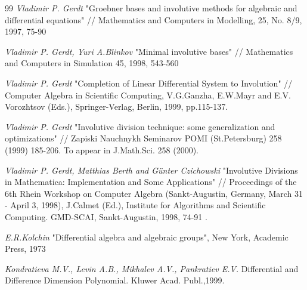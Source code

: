 \documentclass[11pt, draft]{article}
\begin{document}
\begin{thebibliography}{99}
\emph{Vladimir P. Gerdt} "Groebner bases and involutive methods
for algebraic and differential equations" // Mathematics and
Computers in Modelling, 25, No. 8/9, 1997, 75-90

\emph{Vladimir P. Gerdt, Yuri A.Blinkov} "Minimal involutive
bases" // Mathematics and Computers in Simulation 45, 1998,
543-560

\emph{Vladimir P. Gerdt} "Completion of Linear Differential
System to Involution" // Computer Algebra in Scientific Computing,
V.G.Ganzha, E.W.Mayr and E.V. Vorozhtsov (Eds.), Springer-Verlag,
Berlin, 1999, pp.115-137.

\emph{Vladimir P. Gerdt} "Involutive division technique: some
generalization and optimizations" // Zapiski Nauchnykh Seminarov
POMI (St.Petersburg) 258 (1999) 185-206. To appear in J.Math.Sci.
258 (2000).

\emph{Vladimir P. Gerdt, Matthias Berth and G\"{u}nter Czichowski}
"Involutive Divisions in Mathematica: Implementation and Some
Applications" // Proceedings of the 6th Rhein Workshop on
Computer Algebra (Sankt-Augustin, Germany, March 31 - April 3,
1998), J.Calmet (Ed.), Institute for Algorithms and Scientific
Computing. GMD-SCAI, Sankt-Augustin, 1998, 74-91 .

\emph{E.R.Kolchin} "Differential algebra and algebraic groups",
New York, Academic Press, 1973

\emph{Kondratieva M.V., Levin A.B., Mikhalev A.V., Pankratiev
E.V.} Differential and Difference Dimension Polynomial.  Kluwer
Acad. Publ.,1999.

\end{thebibliography}
\end{document}
